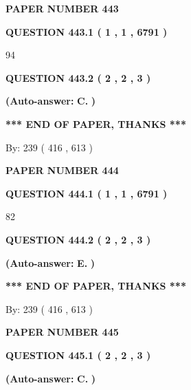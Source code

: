 \documentclass{ctexart}
\begin{document}
   
\newpage 
\setcounter{page}{ 
   443001 } 
   
   
 {\textbf{ \Large{ PAPER NUMBER  443  }}}
   
   
   
   
  
  
{\textbf{\large{QUESTION
443.1 
 ( 1 , 1 , 6791 )
}}}

94
  
  
{\textbf{\large{QUESTION
443.2 
 ( 2 , 2 , 3 )
}}}
 
 
{\textbf{(Auto-answer:}}
{\textbf{\large{
C.}}}
{\textbf{)}}
 
 
   
   
   
   
\vspace{1.0in} 
{\textbf{\large{ *** END OF PAPER, THANKS *** }}} 
   
   
\hspace{1.0in} By: 
 239 ( 416 ,  613 )
   
   
   
   
\newpage 
\setcounter{page}{ 
   444001 } 
   
   
 {\textbf{ \Large{ PAPER NUMBER  444  }}}
   
   
   
   
  
  
{\textbf{\large{QUESTION
444.1 
 ( 1 , 1 , 6791 )
}}}

82
  
  
{\textbf{\large{QUESTION
444.2 
 ( 2 , 2 , 3 )
}}}
 
 
{\textbf{(Auto-answer:}}
{\textbf{\large{
E.}}}
{\textbf{)}}
 
 
   
   
   
   
\vspace{1.0in} 
{\textbf{\large{ *** END OF PAPER, THANKS *** }}} 
   
   
\hspace{1.0in} By: 
 239 ( 416 ,  613 )
   
   
   
   
\newpage 
\setcounter{page}{ 
   445001 } 
   
   
 {\textbf{ \Large{ PAPER NUMBER  445  }}}
   
   
   
   
  
  
{\textbf{\large{QUESTION
445.1 
 ( 2 , 2 , 3 )
}}}
 
 
{\textbf{(Auto-answer:}}
{\textbf{\large{
C.}}}
{\textbf{)}}
 
 
  
\end{document}
